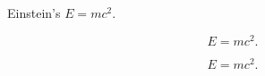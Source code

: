 \documentclass[UTF8]{ctexart}
\begin{document}
Einstein's $E=mc^2$.

\[ E=mc^2. \]

\begin{equation}
E=mc^2.
\end{equation}
\end{document}
